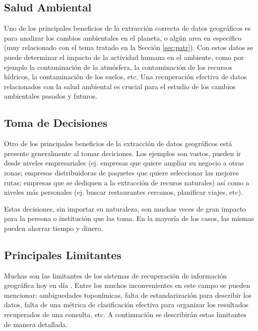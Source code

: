 \documentclass{llncs}
\begin{document}
\subsection{Salud Ambiental}\label{sec:pros}

Uno de los principales beneficios de la extracción correcta de datos
geográficos es para analizar los cambios ambientales \cite{scholten1991} en el
planeta, o algún area en específico (muy relacionado con el tema tratado en la
Sección \ref{sec:patr}). Con estos datos se puede determinar el impacto de la
actividad humana en el ambiente, como por ejemplo la contaminación de la
atmósfera, la contaminación de los recursos hídricos, la contaminación de los
suelos, etc. Una recuperación efectiva de datos relacionados con la salud
ambiental es crucial para el estudio de los cambios ambientales pasados y
futuros.

\subsection{Toma de Decisiones}\label{sec:deci}

Otro de los principales beneficios de la extracción de datos geográficos está
presente generalmente al tomar deciciones. Los ejemplos son vastos, pueden ir
desde niveles empresariales (ej. empresas que quiere ampliar su negocio a otras
zonas; empresas distribuidoras de paquetes que quiere seleccionar las mejores
rutas; empresas que se dediquen a la extracción de recuros naturales) así como
a niveles más personales (ej. buscar restaurantes cercanos, planificar viajes, etc).

Estas decisiones, sin importar su naturaleza, son muchas veces de gran impacto
para la persona o institución que las toma. En la mayoría de los casos,
las mismas pueden ahorrar tiempo y dinero.

\subsection{Principales Limitantes}\label{sec:limit}

Muchas son las limitantes de los sistemas de recuperación de información
geográfica hoy en día \cite{purves2011,purves2004}. Entre los muchos
inconvenientes en este campo se pueden mencionar: ambiguedades toponímicas,
falta de estandarización para describir los datos, falta de una métrica de
clasificación efectiva para organizar los resultados recuperados de una
consulta, etc. A continuación se describirán estas limitantes de
manera detallada.
\end{document}
